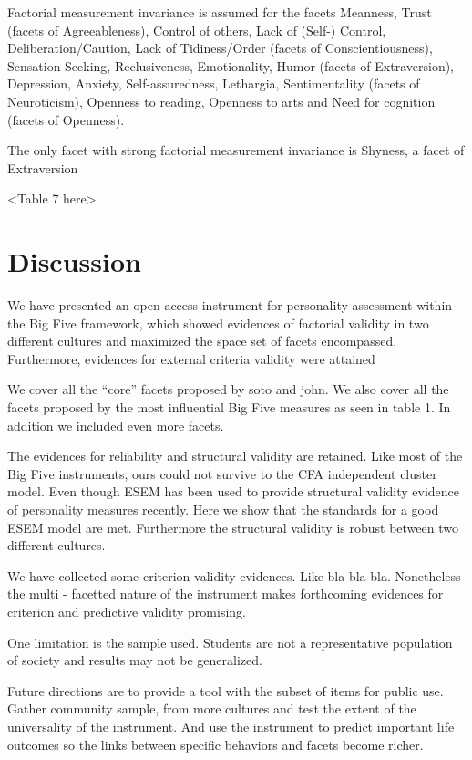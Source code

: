 \documentclass[,man,floatsintext]{apa6}
\theoremstyle{definition}
\theoremstyle{definition}
\theoremstyle{definition}
\theoremstyle{remark}
\begin{document}
Factorial measurement invariance is assumed for the facets Meanness,
Trust (facets of Agreeableness), Control of others, Lack of (Self-)
Control, Deliberation/Caution, Lack of Tidiness/Order (facets of
Conscientiousness), Sensation Seeking, Reclusiveness, Emotionality,
Humor (facets of Extraversion), Depression, Anxiety, Self-assuredness,
Lethargia, Sentimentality (facets of Neuroticism), Openness to reading,
Openness to arts and Need for cognition (facets of Openness).

The only facet with strong factorial measurement invariance is Shyness,
a facet of Extraversion

\textless{}Table 7 here\textgreater{}

\hypertarget{discussion}{%
\section{Discussion}\label{discussion}}

We have presented an open access instrument for personality assessment
within the Big Five framework, which showed evidences of factorial
validity in two different cultures and maximized the space set of facets
encompassed. Furthermore, evidences for external criteria validity were
attained

We cover all the \enquote{core} facets proposed by soto and john. We
also cover all the facets proposed by the most influential Big Five
measures as seen in table 1. In addition we included even more facets.

The evidences for reliability and structural validity are retained. Like
most of the Big Five instruments, ours could not survive to the CFA
independent cluster model. Even though ESEM has been used to provide
structural validity evidence of personality measures recently. Here we
show that the standards for a good ESEM model are met. Furthermore the
structural validity is robust between two different cultures.

We have collected some criterion validity evidences. Like bla bla bla.
Nonetheless the multi - facetted nature of the instrument makes
forthcoming evidences for criterion and predictive validity promising.

One limitation is the sample used. Students are not a representative
population of society and results may not be generalized.

Future directions are to provide a tool with the subset of items for
public use. Gather community sample, from more cultures and test the
extent of the universality of the instrument. And use the instrument to
predict important life outcomes so the links between specific behaviors
and facets become richer.
\end{document}
